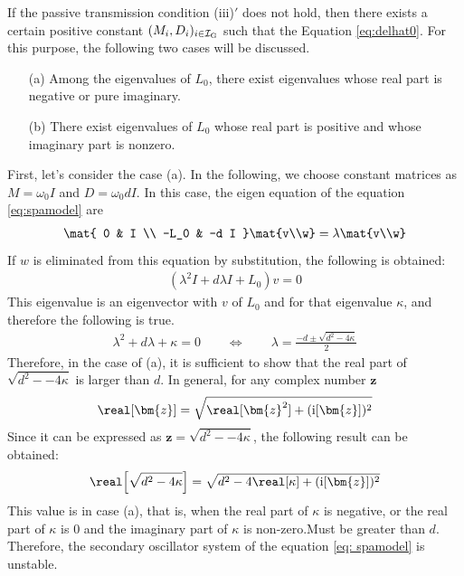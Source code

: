 \documentclass[graybox, envcountchap]{svmult}
\begin{document}
\begin{証明}
If the passive transmission condition (iii)$'$ does not hold, then there exists a certain positive constant $(M_i,D_i)_{i \in \mathcal{I}_{\rm G}}$ such that the Equation \ref{eq:delhat0}.
For this purpose, the following two cases will be discussed.
\begin{itemize}
\item[(a)] Among the eigenvalues of $L_0$, there exist eigenvalues whose real part is negative or pure imaginary.
\item[(b)] There exist eigenvalues of $L_0$ whose real part is positive and whose imaginary part is nonzero.
\end{itemize}
First, let's consider the case (a).
In the following, we choose constant matrices as $M=\omega_0 I$ and $D=\omega_0 d I$.
In this case, the eigen equation of the equation \ref{eq:spamodel} are
\begin{align*}
\mat{
0 & I \\
-L_0 & -d I
}
\mat{v\\w}
=
\lambda \mat{v\\w}
\end{align*}
If $ w $ is eliminated from this equation by substitution, the following is obtained:
\begin{align*}
\left(\lambda^2 I +d \lambda I + L_0
\right) v =0
\end{align*}
This eigenvalue is an eigenvector with $ v $ of $ L_0 $ and for that eigenvalue $ \kappa $, and therefore the following is true.
\begin{align}\label{eq:lamsq}
\lambda^2 + d\lambda +\kappa =0
\qquad
\Longleftrightarrow
\qquad
\lambda = \frac{-d \pm \sqrt{d^2-4\kappa} }{2}
\end{align}
Therefore, in the case of (a), it is sufficient to show that the real part of $ \sqrt{d^2--4\kappa} $ is larger than $ d $.
In general, for any complex number $ \bm{z} $
\begin{align*}
\real[\bm{z}] = \sqrt{ \real[\bm{z}^2 ] + (\imag[\bm{z}])^2 }
\end{align*}
Since it can be expressed as $ \bm{z} = \sqrt{d^2--4\kappa} $, the following result can be obtained:
\begin{align*}
\real \Bigl[
\sqrt{d^2 - 4\kappa }
\Bigr]
=\sqrt{
d^2 - 4 \real[\kappa]
+
(\imag[ \bm{z} ])^2
}
\end{align*}
This value is in case (a), that is, when the real part of $ \kappa $ is negative, or the real part of $ \kappa $ is 0 and the imaginary part of $ \kappa $ is non-zero.Must be greater than $ d $.
Therefore, the secondary oscillator system of the equation \ref{eq: spamodel} is unstable.


\end{証明}
\end{document}
